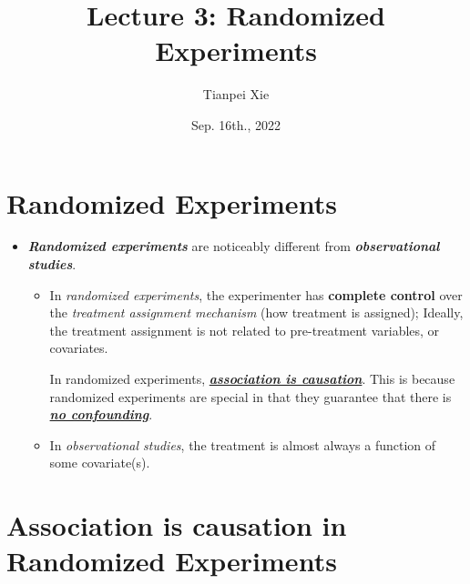 \documentclass[11pt]{article}
\begin{document}
\title{Lecture 3: Randomized Experiments}
\author{ Tianpei Xie}
\date{Sep. 16th., 2022 }
\maketitle
\tableofcontents
\newpage
\allowdisplaybreaks
\section{Randomized Experiments}
\begin{itemize}
\item \emph{\textbf{Randomized experiments}} are noticeably different from \emph{\textbf{observational studies}}.
\begin{itemize}
\item In \emph{randomized experiments}, the experimenter has \textbf{complete control} over the \emph{treatment assignment mechanism} (how treatment is assigned);  Ideally, the treatment assignment is not related to pre-treatment variables, or covariates. 

In randomized experiments, \underline{\emph{\textbf{association is causation}}}. This is because randomized experiments are special in that they guarantee that there is \underline{\textbf{\emph{no confounding}}}.

\item In \emph{observational studies}, the treatment is almost always a function of some covariate(s).
\end{itemize}
\end{itemize}

\section{Association is causation in Randomized Experiments}
\end{document}
